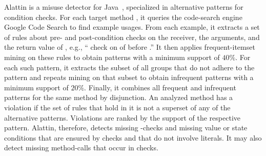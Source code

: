 Alattin is a misuse detector for Java~\cite{TX09b}, specialized in
alternative patterns for condition checks.  For each target method
, it queries the code-search engine Google Code Search
to find example usages.  From each example, it extracts a set of rules
about pre- and post-condition checks on the receiver, the arguments,
and the return value of , e.g., `` check on
 of  before
.''
It then applies frequent-itemset mining on these rules to obtain patterns with a minimum support of $40\%$.
For each such pattern, it extracts the subset of all groups that do not adhere to the pattern and repeats mining on that subset to obtain infrequent patterns with a minimum support of $20\%$.
Finally, it combines all frequent and infrequent patterns for the same method by disjunction.
An analyzed method has a violation if the set of rules that hold in it is not a superset of any of the alternative patterns.
Violations are ranked by the support of the respective pattern.
Alattin, therefore, detects missing -checks and missing value or state conditions that are ensured by checks and that do not involve literals.
It may also detect missing method-calls that occur in checks.
